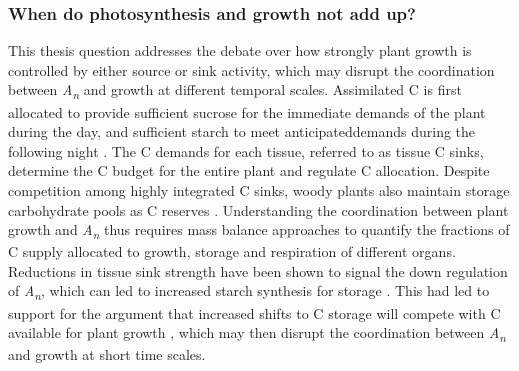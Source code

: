 \documentclass[a4paper]{article}
\begin{document}
\subsubsection*{When do photosynthesis and growth not add up?}

This thesis question addresses the debate over how strongly plant growth is controlled by either source or sink activity, which may disrupt the coordination between \textit{A\textsubscript{n}} and growth at different temporal scales. Assimilated C is first allocated to provide sufficient sucrose for the immediate demands of the plant during the day, and sufficient starch to meet \textquotesingle anticipated\textquotesingle demands during the following night \citep{smith2007coordination}. The C demands for each tissue, referred to as tissue C sinks, determine the C budget for the entire plant and regulate C allocation. Despite competition among highly integrated C sinks, woody plants also maintain storage carbohydrate pools as C reserves \citep{kozlowski1992carbohydrate}. Understanding the coordination between plant growth and \textit{A\textsubscript{n}} thus requires mass balance approaches to quantify the fractions of C supply allocated to growth, storage and respiration of different organs. Reductions in tissue sink strength have been shown to signal the down regulation of \textit{A\textsubscript{n}}, which can led to increased starch synthesis for storage \citep{sage1994acclimation, kitao2007interaction}. This had led to support for the argument that increased shifts to C storage will compete with C available for plant growth \citep{chapin1990ecology}, which may then disrupt the coordination between \textit{A\textsubscript{n}} and growth at short time scales.
\end{document}
